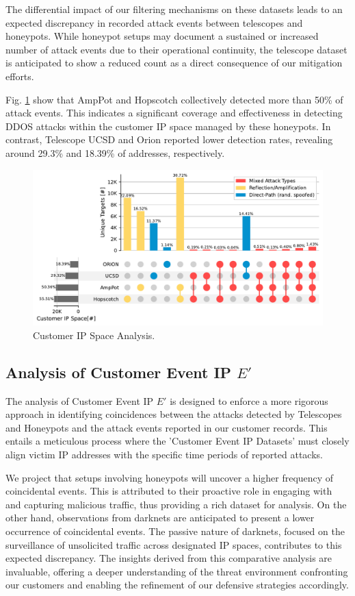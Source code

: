 The differential impact of our filtering mechanisms on these datasets leads to an expected discrepancy in recorded attack events between telescopes and honeypots. While honeypot setups may document a sustained or increased number of attack events due to their operational continuity, the telescope dataset is anticipated to show a reduced count as a direct consequence of our mitigation efforts. 

Fig. \ref{fig:customeripspace} show that AmpPot and Hopscotch collectively detected more than 50\% of attack events. This indicates a significant coverage and effectiveness in detecting DDOS attacks within the customer IP space managed by these honeypots. In contrast, Telescope UCSD and Orion reported lower detection rates, revealing around 29.3\% and 18.39\% of addresses, respectively.

\begin{figure}[htbp]
    \centering
    \includegraphics[scale=0.4]{graphs/space_no_event.pdf}
    \caption{Customer IP Space Analysis.}
    \label{fig:customeripspace}
\end{figure}


\subsection{Analysis of Customer Event IP \(E'\)}
The analysis of Customer Event IP \(E'\) is designed to enforce a more rigorous approach in identifying coincidences between the attacks detected by Telescopes and Honeypots and the attack events reported in our customer records. This entails a meticulous process where the 'Customer Event IP Datasets' must closely align victim IP addresses with the specific time periods of reported attacks.

We project that setups involving honeypots will uncover a higher frequency of coincidental events. This is attributed to their proactive role in engaging with and capturing malicious traffic, thus providing a rich dataset for analysis. On the other hand, observations from darknets are anticipated to present a lower occurrence of coincidental events. The passive nature of darknets, focused on the surveillance of unsolicited traffic across designated IP spaces, contributes to this expected discrepancy. The insights derived from this comparative analysis are invaluable, offering a deeper understanding of the threat environment confronting our customers and enabling the refinement of our defensive strategies accordingly.

